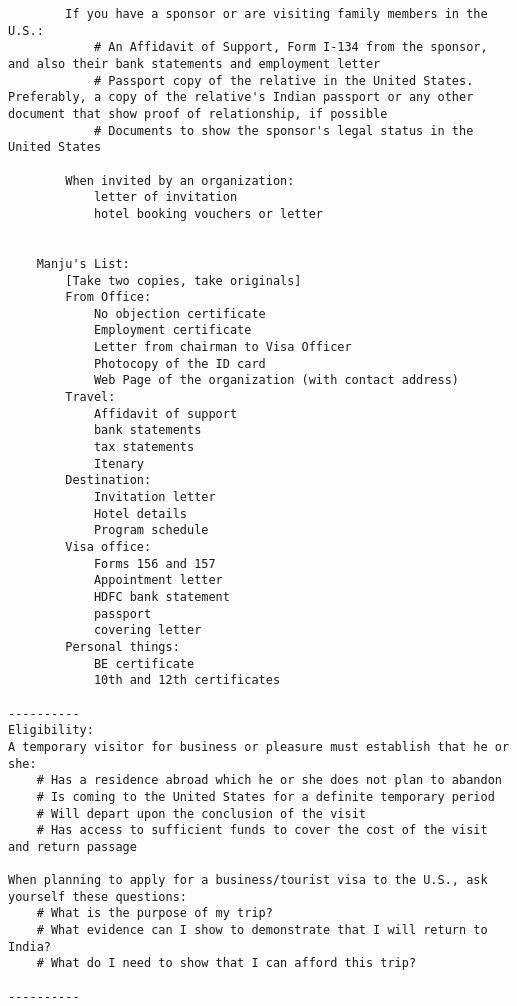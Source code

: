 \documentclass[oneside, article]{memoir}
\begin{document}
\begin{verbatim}
        If you have a sponsor or are visiting family members in the U.S.:
            # An Affidavit of Support, Form I-134 from the sponsor, and also their bank statements and employment letter
            # Passport copy of the relative in the United States. Preferably, a copy of the relative's Indian passport or any other document that show proof of relationship, if possible
            # Documents to show the sponsor's legal status in the United States

        When invited by an organization:
            letter of invitation
            hotel booking vouchers or letter
           
   
    Manju's List:
        [Take two copies, take originals]
        From Office:
            No objection certificate
            Employment certificate
            Letter from chairman to Visa Officer
            Photocopy of the ID card
            Web Page of the organization (with contact address)
        Travel:
            Affidavit of support
            bank statements
            tax statements
            Itenary
        Destination:
            Invitation letter
            Hotel details
            Program schedule
        Visa office:
            Forms 156 and 157
            Appointment letter
            HDFC bank statement
            passport
            covering letter
        Personal things:
            BE certificate
            10th and 12th certificates
   
----------
Eligibility:
A temporary visitor for business or pleasure must establish that he or she:
    # Has a residence abroad which he or she does not plan to abandon
    # Is coming to the United States for a definite temporary period
    # Will depart upon the conclusion of the visit
    # Has access to sufficient funds to cover the cost of the visit and return passage

When planning to apply for a business/tourist visa to the U.S., ask yourself these questions:
    # What is the purpose of my trip?
    # What evidence can I show to demonstrate that I will return to India?
    # What do I need to show that I can afford this trip?

----------
\end{verbatim}
\end{document}
